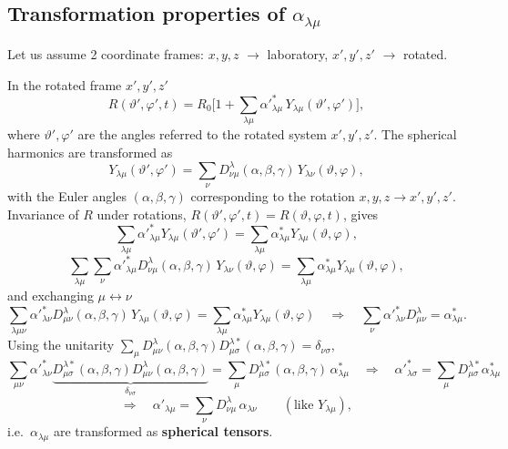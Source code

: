 \documentclass[11pt,a4paper]{article}
\begin{document}
\subsection{Transformation properties of \texorpdfstring{$\alpha_{\lambda\mu}$}{alpha}}
Let us assume 2 coordinate frames: $x,y,z$ $\to$ laboratory, $x',y',z'$ $\to$ rotated.
\begin{center}
\end{center}
In the rotated frame $x',y',z'$
\[
R(\vartheta',\varphi',t)=R_0\Big[1+\sum_{\lambda\mu}\alpha'^*_{\lambda\mu}\,Y_{\lambda\mu}(\vartheta',\varphi')\Big],
\]
where $\vartheta',\varphi'$ are the angles referred to the rotated system $x',y',z'$. The spherical harmonics are transformed as
\[
Y_{\lambda\mu}(\vartheta',\varphi')=\sum_\nu D^\lambda_{\nu\mu}(\alpha,\beta,\gamma)\,Y_{\lambda\nu}(\vartheta,\varphi),
\]
with the Euler angles $(\alpha,\beta,\gamma)$ corresponding to the rotation $x,y,z\to x',y',z'$.
Invariance of $R$ under rotations, $R(\vartheta',\varphi',t)=R(\vartheta,\varphi,t)$, gives
\[
\sum_{\lambda\mu}\alpha'^*_{\lambda\mu}Y_{\lambda\mu}(\vartheta',\varphi')=\sum_{\lambda\mu}\alpha^*_{\lambda\mu}Y_{\lambda\mu}(\vartheta,\varphi),
\]
\[
\sum_{\lambda\mu}\sum_\nu\alpha'^*_{\lambda\mu}D^\lambda_{\nu\mu}(\alpha,\beta,\gamma)\,Y_{\lambda\nu}(\vartheta,\varphi)=\sum_{\lambda\mu}\alpha^*_{\lambda\mu}Y_{\lambda\mu}(\vartheta,\varphi),
\]
and exchanging $\mu\leftrightarrow\nu$
\[
\sum_{\lambda\mu\nu}\alpha'^*_{\lambda\nu}D^\lambda_{\mu\nu}(\alpha,\beta,\gamma)\,Y_{\lambda\mu}(\vartheta,\varphi)=\sum_{\lambda\mu}\alpha^*_{\lambda\mu}Y_{\lambda\mu}(\vartheta,\varphi)
\quad\Rightarrow\quad
\sum_\nu\alpha'^*_{\lambda\nu}D^\lambda_{\mu\nu}=\alpha^*_{\lambda\mu}.
\]
Using the unitarity $\sum_\mu D^\lambda_{\mu\nu}(\alpha,\beta,\gamma)D^{\lambda*}_{\mu\sigma}(\alpha,\beta,\gamma)=\delta_{\nu\sigma}$,
\[
\sum_{\mu\nu}\alpha'^*_{\lambda\nu}\underbrace{D^{\lambda*}_{\mu\sigma}(\alpha,\beta,\gamma)D^\lambda_{\mu\nu}(\alpha,\beta,\gamma)}_{\delta_{\nu\sigma}}=\sum_\mu D^{\lambda*}_{\mu\sigma}(\alpha,\beta,\gamma)\,\alpha^*_{\lambda\mu}
\quad\Rightarrow\quad
\alpha'^*_{\lambda\sigma}=\sum_\mu D^{\lambda*}_{\mu\sigma}\alpha^*_{\lambda\mu}
\]
\[
\Rightarrow\quad \alpha'_{\lambda\mu}=\sum_\nu D^\lambda_{\nu\mu}\,\alpha_{\lambda\nu}
\qquad(\text{like } Y_{\lambda\mu}),
\]
i.e.\ $\alpha_{\lambda\mu}$ are transformed as \textbf{spherical tensors}.
\end{document}
